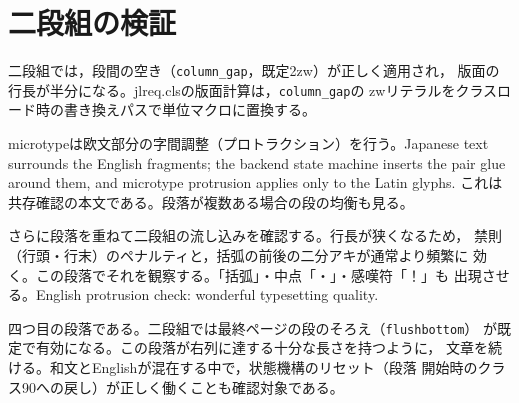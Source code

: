 \documentclass[pdflatex,twocolumn]{jlreq}
\begin{document}
\section{二段組の検証}
二段組では，段間の空き（\texttt{column\_gap}，既定2zw）が正しく適用され，
版面の行長が半分になる。jlreq.clsの版面計算は，\texttt{column\_gap}の
zwリテラルをクラスロード時の書き換えパスで単位マクロに置換する。

microtypeは欧文部分の字間調整（プロトラクション）を行う。Japanese text
surrounds the English fragments; the backend state machine inserts the
pair glue around them, and microtype protrusion applies only to the Latin
glyphs. これは共存確認の本文である。段落が複数ある場合の段の均衡も見る。

さらに段落を重ねて二段組の流し込みを確認する。行長が狭くなるため，
禁則（行頭・行末）のペナルティと，括弧の前後の二分アキが通常より頻繁に
効く。この段落でそれを観察する。「括弧」・中点「・」・感嘆符「！」も
出現させる。English protrusion check: wonderful typesetting quality.

四つ目の段落である。二段組では最終ページの段のそろえ（\texttt{flushbottom}）
が既定で有効になる。この段落が右列に達する十分な長さを持つように，
文章を続ける。和文とEnglishが混在する中で，状態機構のリセット（段落
開始時のクラス90への戻し）が正しく働くことも確認対象である。
\end{document}
